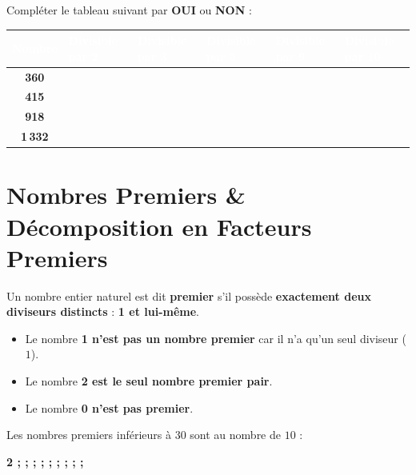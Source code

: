 \begin{cadremethode}
Compléter le tableau suivant par \textbf{OUI} ou \textbf{NON} :
\begin{center}
\renewcommand{\arraystretch}{1.3}
\begin{tabularx}{\linewidth}{|c|X|X|X|X|X|}
\hline
\rowcolor{slate800} \textcolor{white}{\textbf{Nombre}} & \textcolor{white}{\textbf{Divisible par 2}} & \textcolor{white}{\textbf{Divisible par 3}} & \textcolor{white}{\textbf{Divisible par 5}} & \textcolor{white}{\textbf{Divisible par 9}} & \textcolor{white}{\textbf{Divisible par 10}} \\
\hline
\textbf{360} & & & & & \\
\hline
\textbf{415} & & & & & \\
\hline
\textbf{918} & & & & & \\
\hline
\textbf{1\,332} & & & & & \\
\hline
\end{tabularx}
\end{center}
\end{cadremethode}

\section{Nombres Premiers \& Décomposition en Facteurs Premiers}

\begin{cadredef}
Un nombre entier naturel est dit \textbf{premier} s'il possède \textbf{exactement deux diviseurs distincts} : \textbf{1 et lui-même}.
\end{cadredef}

\begin{cadrepiege}
\begin{itemize}
    \item Le nombre \textbf{1 n'est pas un nombre premier} car il n'a qu'un seul diviseur ($1$).
    \item Le nombre \textbf{2 est le seul nombre premier pair}.
    \item Le nombre \textbf{0 n'est pas premier}.
\end{itemize}
\end{cadrepiege}

\begin{cadreprop}
Les nombres premiers inférieurs à $30$ sont au nombre de $10$ :
\begin{center}
\sffamily\bfseries\Large\color{colPrimary}
2 \quad; \quad; \quad; \quad; \quad; \quad; \quad; \quad; \quad;
\end{center}
\end{cadreprop}

